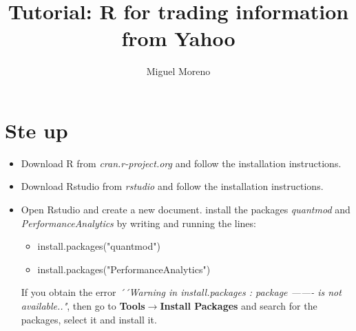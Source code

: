 \documentclass[letterpaper]{article}
\title{Tutorial: R for trading information from Yahoo}
\author{Miguel Moreno}
\date{}
\begin{document}
\maketitle
\section{Ste up}
\begin{itemize}
\item Download R from \textit{cran.r-project.org} and follow the installation instructions.
\item Download Rstudio from \textit{rstudio} and follow the installation instructions.
\item Open Rstudio and create a new document. install the packages \textit{quantmod} and \textit{PerformanceAnalytics} by writing and running the lines:
\begin{itemize}
\item install.packages("quantmod")
\item install.packages("PerformanceAnalytics")
\end{itemize}
If you obtain the error \textit{´´Warning in install.packages :
package ------- is not available.."}, then go to \textbf{Tools}$\rightarrow$\textbf{Install Packages} and search for the packages, select it and install it.  
\end{itemize}
\end{document}
